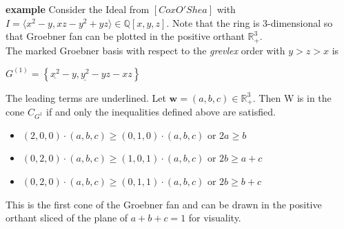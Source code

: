 \textbf{example}
Consider the Ideal from $\left[ Cox O'Shea\right] $ with $ I = \langle x^{2}-y,xz-y^{2}+yz \rangle \in \mathbb{Q}\left[ x,y,z\right] .$
Note that the ring is 3-dimensional so that Groebner fan can be plotted in the positive orthant $ \mathbb{R}^{3}_{+}$. \\
The marked Groebner basis with respect to the \textit{grevlex} order with $y>z>x$ is
\begin{center}
$G^{\left( 1\right) } = \left\lbrace \underline{x^{2}}-y,\underline{y^{2}} -yz -xz\right\rbrace $
\end{center}
The leading terms are underlined. Let $\textbf{w} = \left( a,b,c\right) \in \mathbb{R}^{3}_{+} $. Then W is in the cone $C_{G^{1}}$ if and only the inequalities defined above are satisfied.

\begin{itemize}

\item
$\left( 2,0,0\right) \cdot \left( a,b,c\right) \geq \left( 0,1,0\right) \cdot \left( a,b,c\right) $ or $2a\geq b$ 
\item
$\left( 0,2,0\right) \cdot \left( a,b,c\right) \geq \left( 1,0,1\right) \cdot \left( a,b,c\right) $ or $2b\geq a+c$ 
\item
$\left( 0,2,0\right) \cdot \left( a,b,c\right) \geq \left( 0,1,1\right) \cdot \left( a,b,c\right) $ or $2b\geq b+c$
\end{itemize} 

This is the first cone of the Groebner fan and can be drawn in the positive orthant sliced of the plane of $a+b+c=1$ for visuality.





